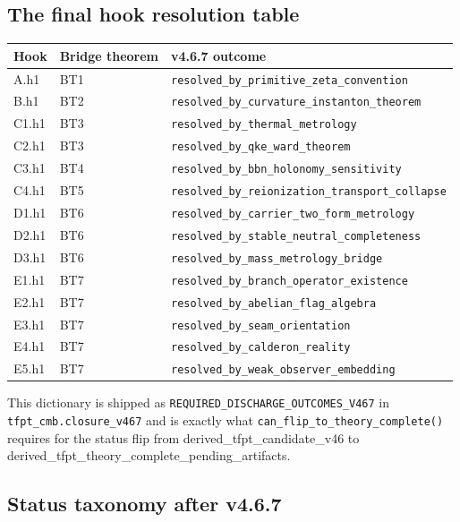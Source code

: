 \subsection{The final hook resolution table}

\begin{center}
\renewcommand{\arraystretch}{1.13}
\begin{tabular}{@{}lll@{}}
\toprule
\textbf{Hook} & \textbf{Bridge theorem} & \textbf{v4.6.7 outcome} \\
\midrule
A.h1   & BT1 & \texttt{resolved\_by\_primitive\_zeta\_convention} \\
B.h1   & BT2 & \texttt{resolved\_by\_curvature\_instanton\_theorem} \\
C1.h1  & BT3 & \texttt{resolved\_by\_thermal\_metrology} \\
C2.h1  & BT3 & \texttt{resolved\_by\_qke\_ward\_theorem} \\
C3.h1  & BT4 & \texttt{resolved\_by\_bbn\_holonomy\_sensitivity} \\
C4.h1  & BT5 & \texttt{resolved\_by\_reionization\_transport\_collapse} \\
D1.h1  & BT6 & \texttt{resolved\_by\_carrier\_two\_form\_metrology} \\
D2.h1  & BT6 & \texttt{resolved\_by\_stable\_neutral\_completeness} \\
D3.h1  & BT6 & \texttt{resolved\_by\_mass\_metrology\_bridge} \\
E1.h1  & BT7 & \texttt{resolved\_by\_branch\_operator\_existence} \\
E2.h1  & BT7 & \texttt{resolved\_by\_abelian\_flag\_algebra} \\
E3.h1  & BT7 & \texttt{resolved\_by\_seam\_orientation} \\
E4.h1  & BT7 & \texttt{resolved\_by\_calderon\_reality} \\
E5.h1  & BT7 & \texttt{resolved\_by\_weak\_observer\_embedding} \\
\bottomrule
\end{tabular}
\end{center}

This dictionary is shipped as
\texttt{REQUIRED\_DISCHARGE\_OUTCOMES\_V467} in
\texttt{tfpt\_cmb.closure\_v467} and is exactly what
\texttt{can\_flip\_to\_theory\_complete()} requires for the status
flip from \textsf{derived\_tfpt\_candidate\_v46} to
\textsf{derived\_tfpt\_theory\_complete\_pending\_artifacts}.

\subsection{Status taxonomy after v4.6.7}

